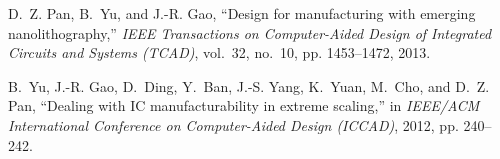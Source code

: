 


\begin{thebibliography}{10}

D.~Z. Pan, B.~Yu, and J.-R. Gao, ``Design for manufacturing with emerging
  nanolithography,'' \emph{IEEE Transactions on Computer-Aided Design of
  Integrated Circuits and Systems (TCAD)}, vol.~32, no.~10, pp. 1453--1472,
  2013.

B.~Yu, J.-R. Gao, D.~Ding, Y.~Ban, J.-S. Yang, K.~Yuan, M.~Cho, and D.~Z. Pan,
  ``Dealing with {IC} manufacturability in extreme scaling,'' in \emph{IEEE/ACM
  International Conference on Computer-Aided Design (ICCAD)}, 2012, pp.
  240--242.

\end{thebibliography}

